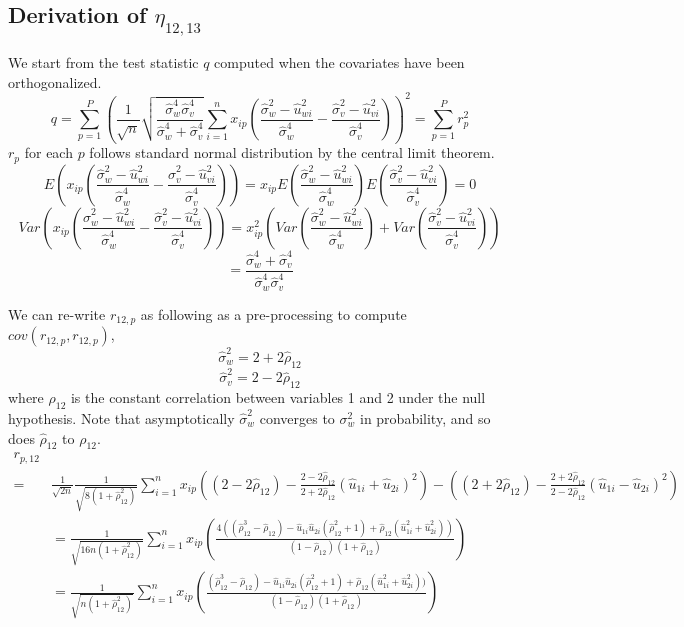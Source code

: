 \documentclass[12pt]{article}
\theoremstyle{theorem}
\begin{document}
\subsection{Derivation of $\eta_{12,13}$}
\noindent We start from the test statistic $q$ computed when the covariates have been orthogonalized.
$$ q = \sum_{p=1}^{P}
 \left(\frac{1}{\sqrt{n}}
 \sqrt{\frac{\hat{\sigma}_w^4 \hat{\sigma}_v^4}{\hat{\sigma}_w^4 + \hat{\sigma}_v^4}}
 \sum_{i=1}^{n} x_{ip} \left( \frac{\hat{\sigma}_w^2 - \hat{u}_{wi}^2}{\hat{\sigma}_w^4}
 - \frac{\hat{\sigma}_v^2 - \hat{u}_{vi}^2}{\hat{\sigma}_v^4}
 \right)
\right)^2 = \sum_{p=1}^{P}r_p^2$$
$r_p$ for each $p$ follows standard normal distribution by the central limit theorem. 
$$E\left(x_{ip}\left( \frac{\hat{\sigma}_w^2 - \hat{u}_{wi}^2}{\hat{\sigma}_w^4}
 - \frac{\hat{\sigma}_v^2 - \hat{u}_{vi}^2}{\hat{\sigma}_v^4}
 \right)\right) = x_{ip} E\left( \frac{\hat{\sigma}_w^2 - \hat{u}_{wi}^2}{\hat{\sigma}_w^4} \right) E\left( \frac{\hat{\sigma}_v^2 - \hat{u}_{vi}^2}{\hat{\sigma}_v^4}
 \right) = 0$$
$$Var\left(x_{ip}\left( \frac{\hat{\sigma}_w^2 - \hat{u}_{wi}^2}{\hat{\sigma}_w^4}
 - \frac{\hat{\sigma}_v^2 - \hat{u}_{vi}^2}{\hat{\sigma}_v^4}
 \right)\right) = 
 x_{ip}^2 \left( Var\left( \frac{\hat{\sigma}_w^2 - \hat{u}_{wi}^2}{\hat{\sigma}_w^4} \right)  + Var\left( \frac{\hat{\sigma}_v^2 - \hat{u}_{vi}^2}{\hat{\sigma}_v^4}
 \right)\right)
 $$
 $$ = \frac{\hat{\sigma}_w^4 + \hat{\sigma}_v^4}{\hat{\sigma}_w^4 \hat{\sigma}_v^4}$$

\noindent We can re-write $r_{12,p}$ as following as a pre-processing to compute $cov(r_{12,p}, r_{12,p})$,
$$\hat{\sigma}_w^2 = 2 + 2\hat{\rho}_{12}$$
$$\hat{\sigma}_v^2 = 2 - 2\hat{\rho}_{12}$$
where $\rho_{12}$ is the constant correlation between variables 1 and 2 under the null hypothesis. Note that asymptotically $\hat{\sigma}_w^2$ converges to $\sigma_w^2$ in probability, and so does $\hat{\rho}_{12}$ to $\rho_{12}$.
\begin{align*}
    r_{p,12}&\\
    = &\frac{1}{\sqrt{2n}} \frac{1}{\sqrt{8(1 + \hat{\rho}_{12}^2)}}
    \sum_{i=1}^{n} x_{ip}\left( (2-2\hat{\rho}_{12})- \frac{2-2\hat{\rho}_{12}}{2+2\hat{\rho}_{12}}(\hat{u}_{1i}+\hat{u}_{2i})^2\right)  - \left( (2+2\hat{\rho}_{12}) - \frac{2+2\hat{\rho}_{12}}{2-2\hat{\rho}_{12}}(\hat{u}_{1i}-\hat{u}_{2i})^2\right)\\
    &= \frac{1}{\sqrt{16n(1+\hat{\rho}_{12}^2)}} \sum_{i=1}^{n}x_{ip}
    \left( 
    \frac{4((\hat{\rho}_{12}^3 - \hat{\rho}_{12}) - \hat{u}_{1i}\hat{u}_{2i}(\hat{\rho}_{12}^2 + 1) + \hat{\rho}_{12}(\hat{u}_{1i}^2 + \hat{u}_{2i}^2))}{(1-\hat{\rho}_{12})(1+\hat{\rho}_{12})}
    \right)\\
    &= \frac{1}{\sqrt{n(1+\hat{\rho}_{12}^2)}}\sum_{i=1}^{n}x_{ip} \left( 
    \frac{(\hat{\rho}_{12}^3 - \hat{\rho}_{12}) - \hat{u}_{1i}\hat{u}_{2i}(\hat{\rho}_{12}^2 + 1) + \hat{\rho}_{12}(\hat{u}_{1i}^2 + \hat{u}_{2i}^2))}{(1-\hat{\rho}_{12})(1+\hat{\rho}_{12})}
    \right)
\end{align*}
\end{document}
